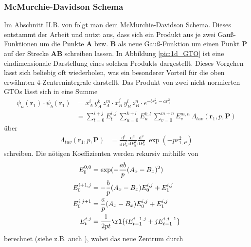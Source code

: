 \subsubsection{McMurchie-Davidson Schema}
%
Im Abschnitt II.B. von \cite{av:1a} folgt man dem McMurchie-Davidson Schema. 
Dieses entstammt der Arbeit \cite{av:2a} und nutzt aus, dass sich ein Produkt 
aus je zwei Gauß-Funktionen um die Punkte \textbf{A} bzw. \textbf{B} als neue 
Gauß-Funktion 
um einen Punkt \textbf{P} auf der Strecke $\overline{\textbf{AB}}$ schreiben 
lassen. In Abbildung \ref{pic:1d_GTO} ist eine eindimensionale Darstellung 
eines solchen Produkts dargestellt. 
%
%
Dieses Vorgehen lässt sich beliebig oft wiederholen, was ein 
besonderer Vorteil für die oben erwähnten 4-Zentrenintegrale darstellt. Das 
Produkt von zwei nicht normierten GTOs lässt sich in eine 
Summe
%
\begin{align}
\psi_a(\textbf{r}_1)\cdot \psi_b(\textbf{r}_1) &=  x_A^i\,y_A^k\,z_A^m\cdot  
x_B^j\,y_B^l\,z_B^n\cdot e^{-b r_B^2-a 
		r_A^2}\\
%
&= \sum_{t=0}^{i+j}E^{i,j}_t\ 
\sum_{u=0}^{k+l}E^{k,l}_u\ \sum_{v=0}^{m+n}E^{m,n}_v\ 
\Lambda_{tuv}(\textbf{r}_1,p,\textbf{P})
\end{align}
%
über
%
\begin{align}
\Lambda_{tuv}(\textbf{r}_1,p,\textbf{P})&=\frac{\text{d}^t}{\text{d}P_x^t}\frac{\text{d}^u}{\text{d}P_y^u}\frac{\text{d}^v}{\text{d}P_z^v}\
 \exp(-p r_{1,P}^2)
\end{align}
%
schreiben.
Die nötigen Koeffizienten werden 
rekursiv mithilfe von
%
\begin{align}\label{eq:E:coef1}
E_0^{0,0}&=\exp(-\frac{ab}{p}(A_x-B_x)^2)\\\label{eq:E:coef2}
E_0^{i+1,j}&=-\frac{b}{p}(A_x-B_x)E^{i,j}_0 + E_1^{i,j}\\\label{eq:E:coef3}
E_0^{i,j+1}&=\frac{a}{p}(A_x-B_x)E^{i,j}_0 + E_1^{i,j}\\\label{eq:E:coef4}
E_t^{i,j} &= \frac{1}{2pt}\rl{iE^{i-1,j}_{t-1}+jE^{i,j-1}_{t-1} }
\end{align}
%
berechnet (siehe z.B. auch \cite{av:3a}), wobei das neue Zentrum durch
